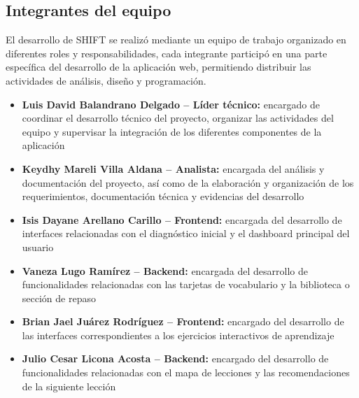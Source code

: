 \subsection{Integrantes del equipo}
El desarrollo de SHIFT se realizó mediante un equipo de trabajo organizado en diferentes roles y responsabilidades, cada integrante participó en una parte específica del desarrollo de la aplicación web, permitiendo distribuir las actividades de análisis, diseño y programación.
\begin{itemize}
\item \textbf{Luis David Balandrano Delgado -- Líder técnico:} encargado de coordinar el desarrollo técnico del proyecto, organizar las actividades del equipo y supervisar la integración de los diferentes componentes de la aplicación
\item \textbf{Keydhy Mareli Villa Aldana -- Analista:} encargada del análisis y documentación del proyecto, así como de la elaboración y organización de los requerimientos, documentación técnica y evidencias del desarrollo
\item \textbf{Isis Dayane Arellano Carillo -- Frontend:} encargada del desarrollo de interfaces relacionadas con el diagnóstico inicial y el dashboard principal del usuario
\item \textbf{Vaneza Lugo Ramírez -- Backend:} encargada del desarrollo de funcionalidades relacionadas con las tarjetas de vocabulario y la biblioteca o sección de repaso
\item \textbf{Brian Jael Juárez Rodríguez -- Frontend:} encargado del desarrollo de las interfaces correspondientes a los ejercicios interactivos de aprendizaje
\item \textbf{Julio  Cesar Licona Acosta -- Backend:} encargado del desarrollo de funcionalidades relacionadas con el mapa de lecciones y las recomendaciones de la siguiente lección
\end{itemize}

